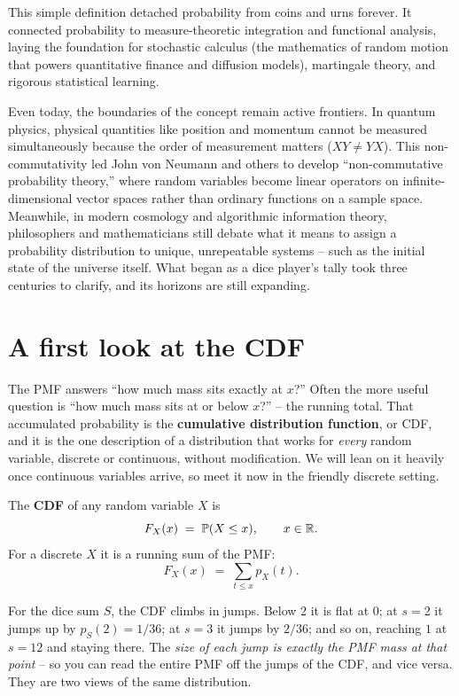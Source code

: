 \begin{historybox}
This simple definition detached probability from coins and urns forever. It connected probability to
measure-theoretic integration and functional analysis, laying the foundation for stochastic
calculus (the mathematics of random motion that powers quantitative finance and
diffusion models), martingale theory, and rigorous statistical learning.

Even today, the boundaries of the concept remain active frontiers. In quantum
physics, physical quantities like position and momentum cannot be measured simultaneously
because the order of measurement matters ($XY \ne YX$). This non-commutativity led John
von Neumann and others to develop ``non-commutative probability theory,'' where random
variables become linear operators on infinite-dimensional vector spaces rather than
ordinary functions on a sample space. Meanwhile, in modern cosmology and algorithmic
information theory, philosophers and mathematicians still debate what it means to assign
a probability distribution to unique, unrepeatable systems -- such as the initial state
of the universe itself. What began as a dice player's tally took three centuries to
clarify, and its horizons are still expanding.
\end{historybox}

\section{A first look at the CDF}
\label{ch06:cdf}

The PMF answers ``how much mass sits exactly at $x$?'' Often the more useful question
is ``how much mass sits at or below $x$?'' -- the running total. That accumulated
probability is the \textbf{cumulative distribution function}, or CDF, and it is the one
description of a distribution that works for \emph{every} random variable, discrete or
continuous, without modification. We will lean on it heavily once continuous variables
arrive, so meet it now in the friendly discrete setting.

\begin{definition}
\label{ch06:def-cdf}
The \textbf{CDF} of any random variable $X$ is
\[
  F_X(x) \;=\; \operatorname{\mathbb{P}}(X \le x), \qquad x \in \mathbb{R}.
\]
For a discrete $X$ it is a running sum of the PMF:
\[
  F_X(x) \;=\; \sum_{t \le x} p_X(t).
\]
\end{definition}

For the dice sum $S$, the CDF climbs in jumps. Below $2$ it is flat at $0$; at $s=2$ it
jumps up by $p_S(2) = 1/36$; at $s=3$ it jumps by $2/36$; and so on, reaching $1$ at
$s=12$ and staying there. The \emph{size of each jump is exactly the PMF mass at that
point} -- so you can read the entire PMF off the jumps of the CDF, and vice versa. They are two views of
the same distribution.

